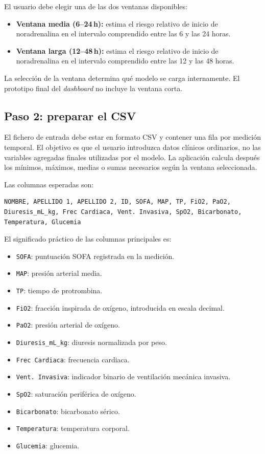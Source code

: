 \documentclass[
  spanish,
  a4paper,
  12pt,
  twoside]{memoir}
\begin{document}
El usuario debe elegir una de las dos ventanas disponibles:

\begin{itemize}
  \item \textbf{Ventana media (6--24\,h):} estima el riesgo relativo de inicio de noradrenalina en el intervalo comprendido entre las 6 y las 24 horas.
  \item \textbf{Ventana larga (12--48\,h):} estima el riesgo relativo de inicio de noradrenalina en el intervalo comprendido entre las 12 y las 48 horas.
\end{itemize}

La selección de la ventana determina qué modelo se carga internamente. El prototipo final del \textit{dashboard} no incluye la ventana corta.

\subsection*{Paso 2: preparar el CSV}

El fichero de entrada debe estar en formato CSV y contener una fila por medición temporal. El objetivo es que el usuario introduzca datos clínicos ordinarios, no las variables agregadas finales utilizadas por el modelo. La aplicación calcula después los mínimos, máximos, medias o sumas necesarios según la ventana seleccionada.

Las columnas esperadas son:

\begin{verbatim}
NOMBRE, APELLIDO 1, APELLIDO 2, ID, SOFA, MAP, TP, FiO2, PaO2,
Diuresis_mL_kg, Frec Cardiaca, Vent. Invasiva, SpO2, Bicarbonato,
Temperatura, Glucemia
\end{verbatim}

El significado práctico de las columnas principales es:

\begin{itemize}
  \item \texttt{SOFA}: puntuación SOFA registrada en la medición.
  \item \texttt{MAP}: presión arterial media.
  \item \texttt{TP}: tiempo de protrombina.
  \item \texttt{FiO2}: fracción inspirada de oxígeno, introducida en escala decimal.
  \item \texttt{PaO2}: presión arterial de oxígeno.
  \item \texttt{Diuresis\_mL\_kg}: diuresis normalizada por peso.
  \item \texttt{Frec Cardiaca}: frecuencia cardiaca.
  \item \texttt{Vent. Invasiva}: indicador binario de ventilación mecánica invasiva.
  \item \texttt{SpO2}: saturación periférica de oxígeno.
  \item \texttt{Bicarbonato}: bicarbonato sérico.
  \item \texttt{Temperatura}: temperatura corporal.
  \item \texttt{Glucemia}: glucemia.
\end{itemize}
\end{document}
